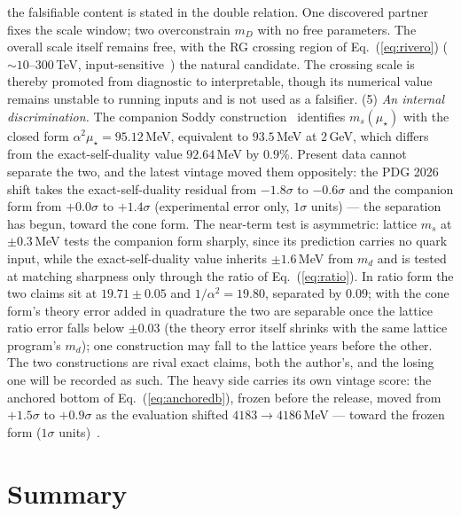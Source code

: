 \documentclass[11pt]{article}
\begin{document}
the falsifiable content is stated in the double relation. One discovered
partner fixes the scale window; two overconstrain $m_D$ with no free
parameters. The overall scale itself remains free, with the RG crossing region of
Eq.~(\ref{eq:rivero}) ($\sim10$--$300$\,TeV, input-sensitive~\cite{Rivero2026})
the natural candidate. The crossing scale is thereby promoted from diagnostic to interpretable, though its numerical value remains unstable to running inputs and is not used as a falsifier. (5) \emph{An internal discrimination.} The companion Soddy construction~\cite{APPB} identifies $m_s(\mu_\star)$ with the closed form $\alpha^2\mu_\star = 95.12$\,MeV, equivalent to $93.5$\,MeV at $2$\,GeV, which differs from the exact-self-duality value $92.64$\,MeV by $0.9\%$. Present data cannot separate the two, and the latest vintage moved them oppositely: the PDG 2026 shift takes the exact-self-duality residual from $-1.8\sigma$ to $-0.6\sigma$ and the companion form from $+0.0\sigma$ to $+1.4\sigma$ (experimental error only, $1\sigma$ units) --- the separation has begun, toward the cone form. The near-term test is asymmetric: lattice $m_s$ at $\pm0.3$\,MeV tests the companion form sharply, since its prediction carries no quark input, while the exact-self-duality value inherits $\pm1.6$\,MeV from $m_d$ and is tested at matching sharpness only through the ratio of Eq.~(\ref{eq:ratio}). In ratio form the two claims sit at $19.71\pm0.05$ and $1/\alpha^2 = 19.80$, separated by $0.09$; with the cone form's theory error added in quadrature the two are separable once the lattice ratio error falls below $\pm0.03$ (the theory error itself shrinks with the same lattice program's $m_d$); one construction may fall to the lattice years before the other. The two constructions are rival exact claims, both the author's, and the losing one will be recorded as such. The heavy side carries its own vintage score: the anchored bottom of Eq.~(\ref{eq:anchoredb}), frozen before the release, moved from $+1.5\sigma$ to $+0.9\sigma$ as the evaluation shifted $4183 \to 4186$\,MeV --- toward the frozen form ($1\sigma$ units)~\cite{Prereg}.

\section{Summary}
\end{document}
